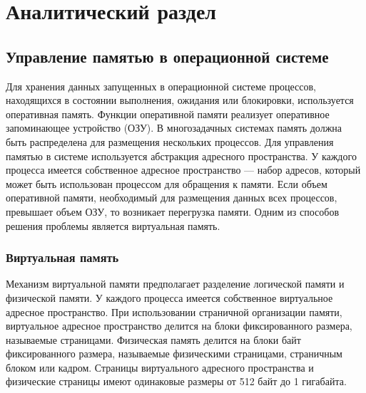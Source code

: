 \chapter{Аналитический раздел}
 




\section{Управление памятью в операционной системе}

Для хранения данных запущенных в операционной системе процессов, находящихся в состоянии выполнения, ожидания или блокировки, используется оперативная память. Функции оперативной памяти реализует оперативное запоминающее устройство (ОЗУ). В многозадачных системах память должна быть распределена для размещения нескольких процессов. Для управления памятью в системе используется абстракция адресного пространства. У каждого процесса имеется собственное адресное пространство --- набор адресов, который может быть использован процессом для обращения к памяти. Если объем оперативной памяти, необходимый для размещения данных всех процессов, превышает объем ОЗУ, то возникает перегрузка памяти. Одним из способов решения проблемы является виртуальная память.

\subsection{Виртуальная память}

Механизм виртуальной памяти предполагает разделение логической памяти и физической памяти. У каждого процесса имеется собственное виртуальное адресное пространство. При использовании страничной организации памяти, виртуальное адресное пространство делится на блоки фиксированного размера, называемые страницами. Физическая память делится на блоки байт фиксированного размера, называемые физическими страницами, страничным блоком или кадром. Страницы виртуального адресного пространства и физические страницы имеют одинаковые размеры от 512 байт до 1 гигабайта.

